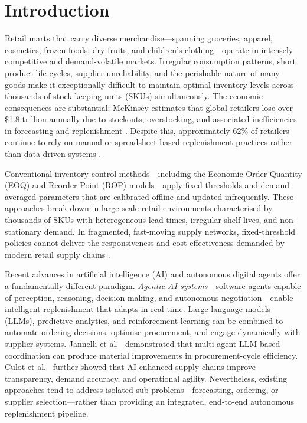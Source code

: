 \documentclass[utf8]{FrontiersinHarvard}
\begin{document}
	\section{Introduction}
	\label{sec:intro}

	Retail marts that carry diverse merchandise---spanning groceries, apparel,
	cosmetics, frozen foods, dry fruits, and children's clothing---operate in
	intensely competitive and demand-volatile markets.  Irregular consumption
	patterns, short product life cycles, supplier unreliability, and the
	perishable nature of many goods make it exceptionally difficult to maintain
	optimal inventory levels across thousands of stock-keeping units (SKUs)
	simultaneously.  The economic consequences are substantial: McKinsey
	estimates that global retailers lose over \$1.8 trillion annually due to
	stockouts, overstocking, and associated inefficiencies in forecasting and
	replenishment \cite{mckinsey2024retailai}.  Despite this, approximately
	62\% of retailers continue to rely on manual or spreadsheet-based
	replenishment practices rather than data-driven systems
	\cite{capgemini2023autonomous}.

	Conventional inventory control methods---including the Economic Order
	Quantity (EOQ) and Reorder Point (ROP) models---apply fixed thresholds
	and demand-averaged parameters that are calibrated offline and updated
	infrequently.  These approaches break down in large-scale retail
	environments characterised by thousands of SKUs with heterogeneous lead
	times, irregular shelf lives, and non-stationary demand.  In fragmented,
	fast-moving supply networks, fixed-threshold policies cannot deliver the
	responsiveness and cost-effectiveness demanded by modern retail supply
	chains \cite{bullwhip2007effect}.

	Recent advances in artificial intelligence (AI) and autonomous digital
	agents offer a fundamentally different paradigm.  \emph{Agentic AI
	systems}---software agents capable of perception, reasoning,
	decision-making, and autonomous negotiation---enable intelligent
	replenishment that adapts in real time.  Large language models (LLMs),
	predictive analytics, and reinforcement learning can be combined to
	automate ordering decisions, optimise procurement, and engage dynamically
	with supplier systems.  Jannelli et al.\ \cite{jannelli2024agentic}
	demonstrated that multi-agent LLM-based coordination can produce material
	improvements in procurement-cycle efficiency.  Culot et al.\
	\cite{culot2024ai} further showed that AI-enhanced supply chains improve
	transparency, demand accuracy, and operational agility.  Nevertheless,
	existing approaches tend to address isolated sub-problems---forecasting,
	ordering, or supplier selection---rather than providing an integrated,
	end-to-end autonomous replenishment pipeline.
\end{document}
